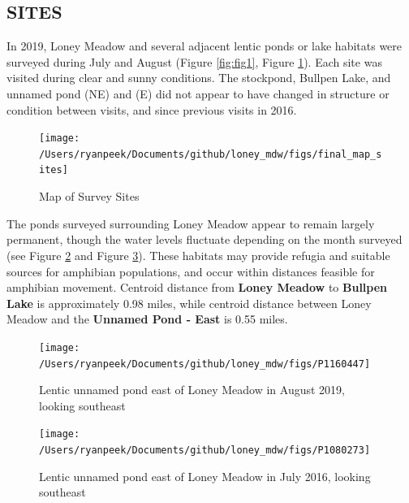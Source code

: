 \documentclass[11pt,a4paper,]{article}
\begin{document}
\hypertarget{sites}{%
\subsection{SITES}\label{sites}}

In 2019, Loney Meadow and several adjacent lentic ponds or lake habitats were surveyed during July and August (Figure \ref{fig:fig1}, Figure \ref{fig:fig2}). Each site was visited during clear and sunny conditions. The stockpond, Bullpen Lake, and unnamed pond (NE) and (E) did not appear to have changed in structure or condition between visits, and since previous visits in 2016.

\begin{figure}

{\centering \texttt{[image: /Users/ryanpeek/Documents/github/loney\_mdw/figs/final\_map\_sites]} 

}

\caption{Map of Survey Sites}\label{fig:fig2}
\end{figure}

The ponds surveyed surrounding Loney Meadow appear to remain largely permanent, though the water levels fluctuate depending on the month surveyed (see Figure \ref{fig:fig3} and Figure \ref{fig:fig4}). These habitats may provide refugia and suitable sources for amphibian populations, and occur within distances feasible for amphibian movement. Centroid distance from \textbf{Loney Meadow} to \textbf{Bullpen Lake} is approximately 0.98 miles, while centroid distance between Loney Meadow and the \textbf{Unnamed Pond - East} is 0.55 miles.

\begin{figure}

{\centering \texttt{[image: /Users/ryanpeek/Documents/github/loney\_mdw/figs/P1160447]} 

}

\caption{Lentic unnamed pond east of Loney Meadow in August 2019, looking southeast}\label{fig:fig3}
\end{figure}

\begin{figure}

{\centering \texttt{[image: /Users/ryanpeek/Documents/github/loney\_mdw/figs/P1080273]} 

}

\caption{Lentic unnamed pond east of Loney Meadow in July 2016, looking southeast}\label{fig:fig4}
\end{figure}
\end{document}
